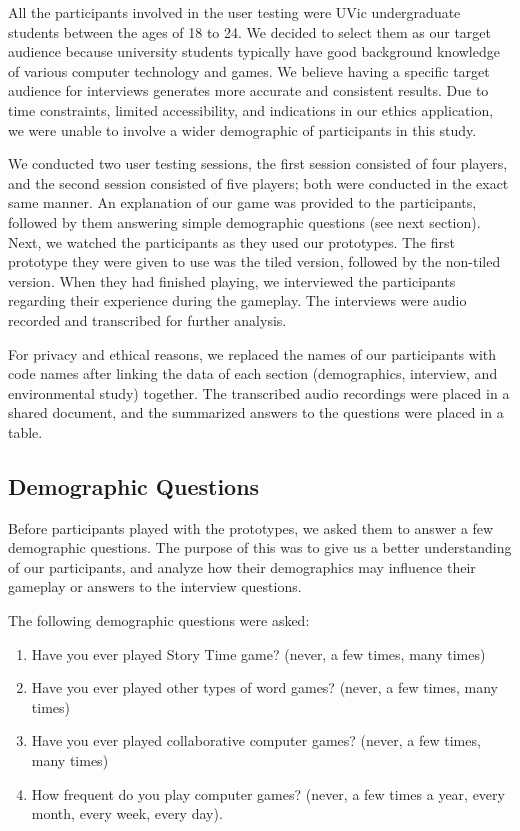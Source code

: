 \documentclass{sigchi}
\begin{document}
All the participants involved in the user testing were UVic undergraduate students between the ages of 18 to 24. We decided to select them as our target audience because university students typically have good background knowledge of various computer technology and games. We believe having a specific target audience for interviews generates more accurate and consistent results. Due to time constraints, limited accessibility, and indications in our ethics application, we were unable to involve a wider demographic of participants in this study. 

We conducted two user testing sessions, the first session consisted of four players, and the second session consisted of five players; both were conducted in the exact same manner. An explanation of our game was provided to the participants, followed by them answering simple demographic questions (see next section). Next, we watched the participants as they used our prototypes. The first prototype they were given to use was the tiled version, followed by the non-tiled version. When they had finished playing, we interviewed the participants regarding their experience during the gameplay. The interviews were audio recorded and transcribed for further analysis.

For privacy and ethical reasons, we replaced the names of our participants with code names after linking the data of each section (demographics, interview, and environmental study) together. The transcribed audio recordings were placed in a shared document, and the summarized answers to the questions were placed in a table.

\subsection{Demographic Questions}
Before participants played with the prototypes, we asked them to answer a few demographic questions. The purpose of this was to give us a better understanding of our participants, and analyze how their demographics may influence their gameplay or answers to the interview questions. 

The following demographic questions were asked:
\begin{enumerate}[leftmargin=.5in, noitemsep]
    \item Have you ever played Story Time game? (never, a few times, many times)
    \item Have you ever played other types of word games? (never, a few times, many times)
    \item Have you ever played collaborative computer games? (never, a few times, many times)
    \item How frequent do you play computer games? (never, a few times a year, every month, every week, every day).

\end{enumerate}
\end{document}
